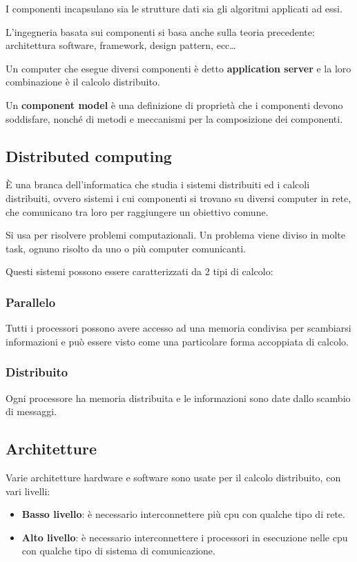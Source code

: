 \documentclass{report}
\begin{document}
\noindent
I componenti incapsulano sia le strutture dati sia gli algoritmi applicati ad essi.

\noindent
L'ingegneria basata sui componenti si basa anche sulla teoria precedente: architettura software, framework, design pattern, ecc\dots

\smallskip
\noindent
Un computer che esegue diversi componenti è detto \textbf{application server} e la loro combinazione è il calcolo distribuito.

\noindent
Un \textbf{component model} è una definizione di proprietà che i componenti devono soddisfare, nonché di metodi e meccanismi per la composizione dei componenti.

\subsection*{Distributed computing}
\`E una branca dell'informatica che studia i sistemi distribuiti ed i calcoli distribuiti, ovvero sistemi i cui componenti si trovano su diversi computer in rete, che comunicano tra loro per raggiungere un obiettivo comune.

\smallskip
\noindent
Si usa per risolvere problemi computazionali. Un problema viene diviso in molte task, ognuno risolto da uno o più computer comunicanti.

\newpage
\noindent
Questi sistemi possono essere caratterizzati da 2 tipi di calcolo:
\subsubsection*{Parallelo}
Tutti i processori possono avere accesso ad una memoria condivisa per scambiarsi informazioni e può  essere visto come una particolare forma accoppiata di calcolo.
\subsubsection*{Distribuito}
Ogni processore ha memoria distribuita e le informazioni sono date dallo scambio di messaggi.

\subsection*{Architetture}
Varie architetture hardware e software sono usate per il calcolo distribuito, con vari livelli:
\begin{itemize}
    \item \textbf{Basso livello}: è necessario interconnettere più cpu con qualche tipo di rete.
    \item \textbf{Alto livello}: è necessario interconnettere i processori in esecuzione nelle cpu con qualche tipo di sistema di comunicazione.
\end{itemize}
\end{document}
